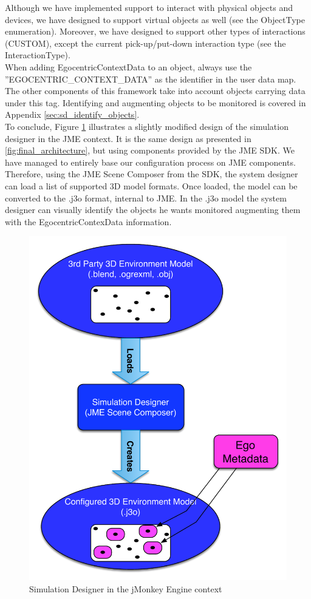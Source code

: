 Although we have implemented support to interact with physical objects and devices, we have designed to support virtual objects as well (see the ObjectType enumeration). Moreover, we have designed to support other types of interactions (CUSTOM), except the current pick-up/put-down interaction type (see the InteractionType).\\

When adding EgocentricContextData to an object, always use the ''EGOCENTRIC\_CONTEXT\_DATA'' as the identifier in the user data map. The other components of this framework take into account objects carrying data under this tag. Identifying and augmenting objects to be monitored is covered in Appendix \ref{sec:sd_identify_objects}.\\

To conclude, Figure \ref{fig:impl_simulation_designer} illustrates a slightly modified design of the simulation designer in the JME context. It is the same design as presented in \ref{fig:final_architecture}, but using components provided by the JME SDK. We have managed to entirely base our configuration process on JME components. Therefore, using the JME Scene Composer from the SDK, the system designer can load a list of supported 3D model formats. Once loaded, the model can be converted to the .j3o format, internal to JME. In the .j3o model the system designer can visually identify the objects he wants monitored augmenting them with the EgocentricContexData information.\\
\begin{figure}[H]
	\centering
	\includegraphics[width=\linewidth]{gfx/Chapter4/simulation_designer}
	\caption{Simulation Designer in the jMonkey Engine context}
	\label{fig:impl_simulation_designer}
\end{figure}
